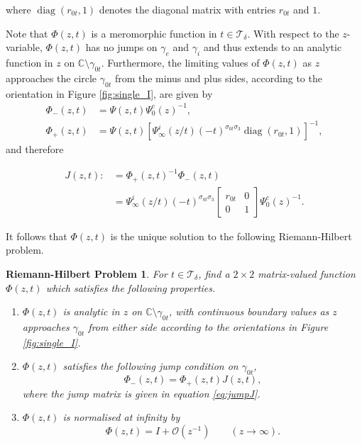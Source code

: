\documentclass[a4paper,reqno,11pt]{amsart}
\numberwithin{equation}{section}
\numberwithin{figure}{section}
\theoremstyle{plain}
\newtheorem{rhprob}{Riemann-Hilbert Problem}
\theoremstyle{remark}
\newcounter{rhp}
\numberwithin{rhp}{section}
\begin{document}
where $\operatorname{diag}(r_{0t},1)$ denotes the diagonal matrix with entries $r_{0t}$ and $1$.

Note that $\Phi(z,t)$ is a meromorphic function in $t\in \mathcal{T}_\delta$. With respect to the $z$-variable, $\Phi(z,t)$ has no jumps on $\gamma_e$ and $\gamma_i$ and thus extends to an analytic function in $z$ on $\mathbb{C}\setminus \gamma_{0t}$. Furthermore, the limiting values of $\Phi(z,t)$ as $z$ approaches the circle $\gamma_{0t}$ from the minus and plus sides, according to the orientation in Figure \ref{fig:single_I}, are given by
\begin{align*}
    \Phi_{-}(z,t) &= \Psi(z,t) \Psi_0^e(z)^{-1}, \\
    \Phi_{+}(z,t) &= \Psi(z,t) [\Psi_\infty^i(z/t)(-t)^{\sigma_{0t}\sigma_3} \operatorname{diag}(r_{0t},1)]^{-1},
\end{align*}
and therefore

\begin{align}
        J(z,t):&=\Phi_+(z,t)^{-1}\Phi_-(z,t)\label{eq:factorisationdirect}\\
        &= \Psi_\infty^i(z/t)(-t)^{\sigma_{0t}\sigma_3}\begin{bmatrix}r_{0t} & 0\\
    0 & 1\end{bmatrix}\Psi_0^e(z)^{-1}.
     \label{eq:jumpJ}
\end{align}







It follows that $\Phi(z,t)$ is the unique solution to the following Riemann-Hilbert problem.



\begin{rhprob}\label{rhp:circle} For $t\in \mathcal{T}_\delta$,
find a $2\times 2$ matrix-valued function $\Phi(z,t)$ which satisfies the following properties.
  \begin{enumerate}[label={{\rm (\roman *)}}]
  \item $\Phi(z,t)$ is analytic in $z$ on $\mathbb{C}\setminus \gamma_{0t}$, with continuous boundary values as $z$ approaches $\gamma_{0t}$ from either side according to the orientations in Figure \ref{fig:single_I}.
    \item $\Phi(z,t)$ satisfies the following jump condition on $\gamma_{0t}$,
\begin{equation}\label{eq:jumprhp}
    \Phi_-(z,t)=\Phi_+(z,t)J(z,t),
\end{equation}
where the jump matrix is given in equation \eqref{eq:jumpJ}.
 \item $\Phi(z,t)$ is normalised at infinity by
              \begin{equation*}
		\Phi(z,t)=I+\mathcal{O}(z^{-1})\qquad (z\rightarrow \infty).
              \end{equation*}
    \end{enumerate}
\end{rhprob}
\end{document}
